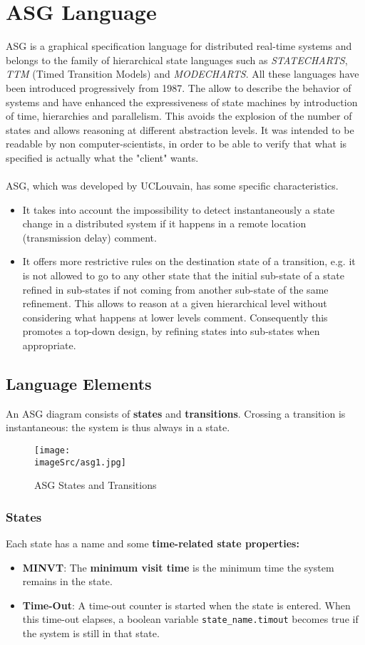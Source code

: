 \documentclass[../main.tex]{subfiles}
\renewcommand{\imageSrc}{../images/}
\begin{document}
\chapter{ASG Language}
ASG is a graphical specification language for distributed real-time systems and belongs to the family of hierarchical state languages such as \textit{STATECHARTS}, \textit{TTM} (Timed Transition Models) and \textit{MODECHARTS}. All these languages have been introduced progressively from 1987. The allow to describe the behavior of systems and have enhanced the expressiveness of state machines by introduction of time, hierarchies and parallelism. This avoids the explosion of the number of states and allows reasoning at different abstraction levels. It was intended to be readable by non computer-scientists, in order to be able to verify that what is specified is actually what the "client" wants.
\\\\
ASG, which was developed by UCLouvain, has some specific characteristics. 
\begin{itemize}
	\item It takes into account the impossibility to detect instantaneously a state change in a distributed system if it happens in a remote location (transmission delay) comment.
	\item It offers more restrictive rules on the destination state of a transition, e.g. it is not allowed to go to any other state that the initial sub-state of a state refined in sub-states if not coming from another sub-state of the same refinement. This allows to reason at a given hierarchical level without considering what happens at lower levels  comment. Consequently this promotes a top-down design, by refining states into sub-states when appropriate.
\end{itemize}

\section{Language Elements}
An ASG diagram consists of \textbf{states} and \textbf{transitions}. Crossing a transition is instantaneous: the system is thus always in a state.
\begin{figure}[h!]
    \centering
    \texttt{[image: \\imageSrc/asg1.jpg]}
    \caption{ASG States and Transitions}
    \label{asg1}
\end{figure}

\subsection{States}
Each state has a name and some \textbf{time-related state properties:}
\begin{itemize}
	\item \textbf{MINVT}: The \textbf{minimum visit time} is the minimum time the system remains in the state.
	\item \textbf{Time-Out}: A time-out counter is started when the state is entered. When this time-out elapses, a boolean variable \texttt{state\_name.timout} becomes true if the system is still in that state. 
\end{itemize}
\end{document}
